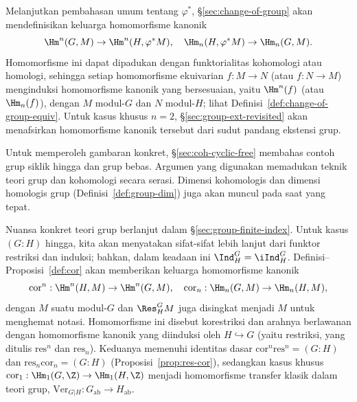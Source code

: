 Melanjutkan pembahasan umum tentang $\varphi^*$,
\S\ref{sec:change-of-group} akan mendefinisikan keluarga homomorfisme kanonik
\[ \Hm^n(G, M) \to \Hm^n(H, \varphi^* M), \quad \Hm_n(H, \varphi^* M) \to \Hm_n(G, M). \]
Homomorfisme ini dapat dipadukan dengan funktorialitas kohomologi atau homologi,
sehingga setiap homomorfisme ekuivarian $f:M\to N$ (atau $f:N\to M$)
menginduksi homomorfisme kanonik yang bersesuaian, yaitu $\Hm^n(f)$ (atau
$\Hm_n(f)$), dengan $M$ modul-$G$ dan $N$ modul-$H$; lihat
Definisi~\ref{def:change-of-group-equiv}. Untuk kasus khusus $n=2$,
\S\ref{sec:group-ext-revisited} akan menafsirkan homomorfisme kanonik tersebut
dari sudut pandang ekstensi grup.

Untuk memperoleh gambaran konkret, \S\ref{sec:coh-cyclic-free} membahas contoh
grup siklik hingga dan grup bebas. Argumen yang digunakan memadukan teknik
teori grup dan kohomologi secara serasi. Dimensi kohomologis dan
dimensi homologis grup (Definisi~\ref{def:group-dim}) juga akan muncul pada
saat yang tepat.

Nuansa konkret teori grup berlanjut dalam \S\ref{sec:group-finite-index}. Untuk
kasus $(G:H)$ hingga, kita akan menyatakan sifat-sifat lebih lanjut dari funktor
restriksi dan induksi; bahkan, dalam keadaan ini
$\Ind^G_H=\iInd^G_H$. Definisi--Proposisi~\ref{def:cor} akan memberikan
keluarga homomorfisme kanonik
\[ \mathrm{cor}^n: \Hm^n(H, M) \to \Hm^n(G, M), \quad \mathrm{cor}_n: \Hm_n(G, M) \to \Hm_n(H, M), \]
dengan $M$ suatu modul-$G$ dan $\Res^G_HM$ juga disingkat menjadi $M$ untuk
menghemat notasi. Homomorfisme ini disebut korestriksi dan arahnya berlawanan
dengan homomorfisme kanonik yang diinduksi oleh $H\hookrightarrow G$ (yaitu
restriksi, yang ditulis $\mathrm{res}^n$ dan $\mathrm{res}_n$). Keduanya
memenuhi identitas dasar
$\mathrm{cor}^n\mathrm{res}^n=(G:H)$ dan
$\mathrm{res}_n\mathrm{cor}_n=(G:H)$
(Proposisi~\ref{prop:res-cor}), sedangkan kasus khusus
$\mathrm{cor}_1:\Hm_1(G,\Z)\to\Hm_1(H,\Z)$ menjadi homomorfisme transfer
klasik dalam teori grup,
$\mathrm{Ver}_{G|H}:G_{\mathrm{ab}}\to H_{\mathrm{ab}}$.

